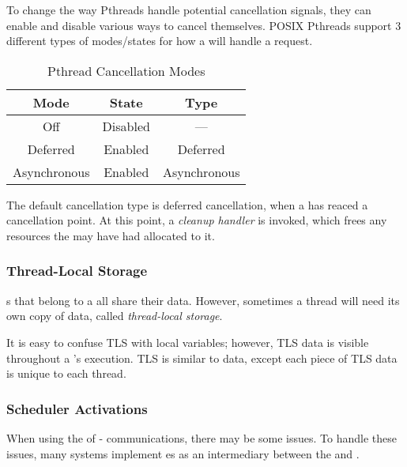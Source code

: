 To change the way Pthreads handle potential cancellation signals, they can enable and disable various ways to cancel themselves.
POSIX Pthreads support 3 different types of modes/states for how a  will handle a request.
\begin{table}[h!tbp]
  \centering
  \begin{tabular}{ccc}
    \toprule
    Mode & State & Type \\
    \midrule
    Off & Disabled & --- \\
    Deferred & Enabled & Deferred \\
    Asynchronous & Enabled & Asynchronous \\
    \bottomrule
  \end{tabular}
  \caption{Pthread Cancellation Modes}
  \label{tab:Pthread_Cancellation_Modes}
\end{table}

The default cancellation type is deferred cancellation, when a  has reaced a cancellation point.
At this point, a \emph{cleanup handler} is invoked, which frees any resources the  may have had allocated to it.

\subsubsection{Thread-Local Storage}\label{subsubsec:Thread_Local_Storage}
s that belong to a  all share their data.
However, sometimes a thread will need its own copy of data, called \emph{thread-local storage}.

\begin{blackbox}
  It is easy to confuse TLS with local variables; however, TLS data is visible throughout a 's execution.
  TLS is similar to  data, except each piece of TLS data is unique to each thread.
\end{blackbox}

\subsubsection{Scheduler Activations}\label{subsubsec:Scheduler_Activations}
When using the  of - communications, there may be some issues.
To handle these issues, many systems implement es as an intermediary between the  and .

